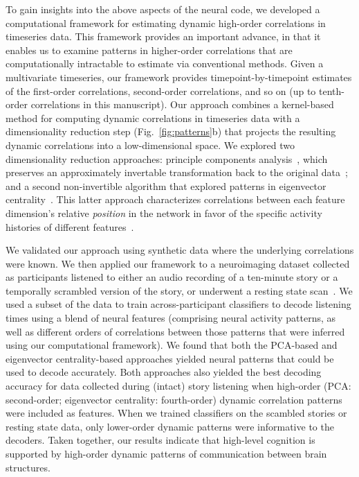 \documentclass[english]{article}
\begin{document}
To gain insights into the above aspects of the neural code, we
developed a computational framework for estimating dynamic high-order
correlations in timeseries data. This framework provides an important
advance, in that it enables us to examine patterns in higher-order
correlations that are computationally intractable to estimate via
conventional methods.  Given a multivariate timeseries, our framework
provides timepoint-by-timepoint estimates of the first-order
correlations, second-order correlations, and so on (up to tenth-order
correlations in this manuscript).  Our approach combines a
kernel-based method for computing dynamic correlations in timeseries
data with a dimensionality reduction step (Fig.~\ref{fig:patterns}b)
that projects the resulting dynamic correlations into a
low-dimensional space.  We explored two dimensionality reduction
approaches: principle components analysis~\citep[PCA;][]{Pear01},
which preserves an approximately invertable transformation back to the
original data~\citep[e.g., this follows related approaches taken
by][]{McInJirs19, TokeSomm19, GonzEtal19}; and a second non-invertible
algorithm that explored patterns in eigenvector
centrality~\citep{Land95}.  This latter approach characterizes
correlations between each feature dimension's relative
\textit{position} in the network in favor of the specific activity
histories of different features~\citep[also see][]{BetzEtal19,
  SizeEtal18, ReimEtal17}.

We validated our approach using synthetic data where the underlying
correlations were known.  We then applied our framework to a
neuroimaging dataset collected as participants
listened to either an audio recording of a ten-minute story or a
temporally scrambled version of the story, or underwent a resting
state scan~\citep{SimoEtal16}.  We used a subset of the data to train
across-participant classifiers to decode listening times using a blend
of neural features (comprising neural activity patterns, as well as
different orders of correlations between those patterns that were
inferred using our computational framework).  We found that both the
PCA-based and eigenvector centrality-based approaches yielded neural
patterns that could be used to decode accurately.  Both approaches
also yielded the best decoding accuracy for data collected during
(intact) story listening when high-order (PCA: second-order;
eigenvector centrality: fourth-order) dynamic correlation patterns
were included as features.  When we trained classifiers on the
scambled stories or resting state data, only lower-order dynamic
patterns were informative to the decoders.  Taken together, our
results indicate that high-level cognition is supported by high-order
dynamic patterns of communication between brain structures.
\end{document}
